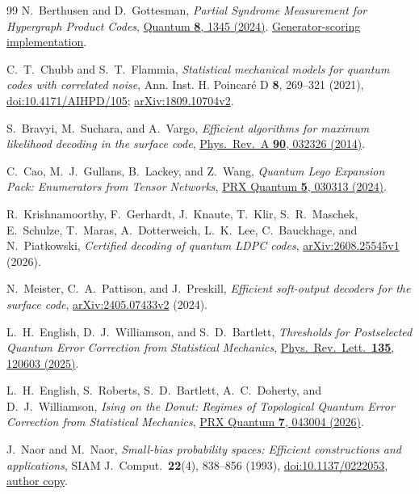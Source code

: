 \documentclass[10pt,twocolumn]{article}
\theoremstyle{definition}
\begin{document}
\begin{thebibliography}{99}
N.~Berthusen and D.~Gottesman,
\emph{Partial Syndrome Measurement for Hypergraph Product Codes},
\href{https://doi.org/10.22331/q-2024-05-14-1345}{Quantum \textbf{8}, 1345 (2024)}.
\href{https://github.com/noahberthusen/hgp_partial_syndrome/blob/30567cbb5401195cd4b1fb0e4c57b8c0f76c5945/src/src_py/score_gen.py}{Generator-scoring implementation}.

C.~T.~Chubb and S.~T.~Flammia,
\emph{Statistical mechanical models for quantum codes with correlated noise},
Ann. Inst. H. Poincar\'e D \textbf{8}, 269--321 (2021),
\href{https://doi.org/10.4171/AIHPD/105}{doi:10.4171/AIHPD/105};
\href{https://arxiv.org/abs/1809.10704v2}{arXiv:1809.10704v2}.

S.~Bravyi, M.~Suchara, and A.~Vargo,
\emph{Efficient algorithms for maximum likelihood decoding in the surface code},
\href{https://doi.org/10.1103/PhysRevA.90.032326}{Phys.\ Rev.\ A \textbf{90}, 032326 (2014)}.

C.~Cao, M.~J.~Gullans, B.~Lackey, and Z.~Wang,
\emph{Quantum Lego Expansion Pack: Enumerators from Tensor Networks},
\href{https://doi.org/10.1103/PRXQuantum.5.030313}{PRX Quantum \textbf{5}, 030313 (2024)}.

R.~Krishnamoorthy, F.~Gerhardt, J.~Knaute, T.~Klir, S.~R.~Maschek,
E.~Schulze, T.~Maras, A.~Dotterweich, L.~K.~Lee, C.~Bauckhage,
and N.~Piatkowski, \emph{Certified decoding of quantum LDPC codes},
\href{https://arxiv.org/abs/2608.25545v1}{arXiv:2608.25545v1} (2026).

N.~Meister, C.~A.~Pattison, and J.~Preskill,
\emph{Efficient soft-output decoders for the surface code},
\href{https://arxiv.org/abs/2405.07433v2}{arXiv:2405.07433v2} (2024).

L.~H.~English, D.~J.~Williamson, and S.~D.~Bartlett,
\emph{Thresholds for Postselected Quantum Error Correction from Statistical Mechanics},
\href{https://doi.org/10.1103/nh49-52y2}{Phys.\ Rev.\ Lett.\ \textbf{135}, 120603 (2025)}.

L.~H.~English, S.~Roberts, S.~D.~Bartlett, A.~C.~Doherty, and D.~J.~Williamson,
\emph{Ising on the Donut: Regimes of Topological Quantum Error Correction from Statistical Mechanics},
\href{https://doi.org/10.1103/4wvz-1p8m}{PRX Quantum \textbf{7}, 043004 (2026)}.

J.~Naor and M.~Naor,
\emph{Small-bias probability spaces: Efficient constructions and applications},
SIAM J.\ Comput.\ \textbf{22}(4), 838--856 (1993),
\href{https://doi.org/10.1137/0222053}{doi:10.1137/0222053},
\href{https://www.wisdom.weizmann.ac.il/~naor/PAPERS/bias.pdf}{author copy}.


\end{thebibliography}
\end{document}
